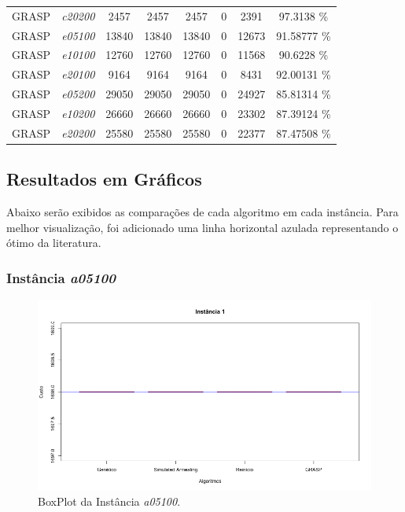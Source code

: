 \documentclass[portugues, brazil, a4paper,12pt]{article}
\begin{document}
{\begin{longtable}{cc|cccc|cc}
			GRASP              & \textit{c20200}  & 2457      & 2457           & 2457         & 0                      &  2391                           & 97.3138                     \% \\
			GRASP              & \textit{e05100}  & 13840     & 13840          & 13840        & 0                      &   12673                         & 91.58777                       \% \\
			GRASP              & \textit{e10100}  & 12760     & 12760          & 12760        & 0                      &   11568                         & 90.6228                       \% \\
			GRASP              & \textit{e20100}  & 9164      & 9164           & 9164         & 0                      &   8431                          & 92.00131                       \% \\
			GRASP              & \textit{e05200}  & 29050     & 29050          & 29050        & 0                      &   24927                         & 85.81314                       \% \\
			GRASP              & \textit{e10200}  & 26660     & 26660          & 26660        & 0                      &   23302                         & 87.39124                       \% \\
			GRASP              & \textit{e20200}  & 25580     & 25580          & 25580        & 0                      &   22377                         & 87.47508           \% \\ \hline
		\end{longtable}
	}

	
	\subsection{Resultados em Gráficos}
		Abaixo serão exibidos as comparações de cada algoritmo em cada instância. Para melhor visualização, foi adicionado uma linha horizontal azulada representando o ótimo da literatura.
	
		\subsubsection{Instância \textit{a05100}}
			\begin{figure}[H]
				\centering
				\includegraphics[width=1\linewidth]{img/1.png}
				\caption{BoxPlot da Instância \textit{a05100}.}
				\label{fig:a05100}
			\end{figure}
	
\end{document}
